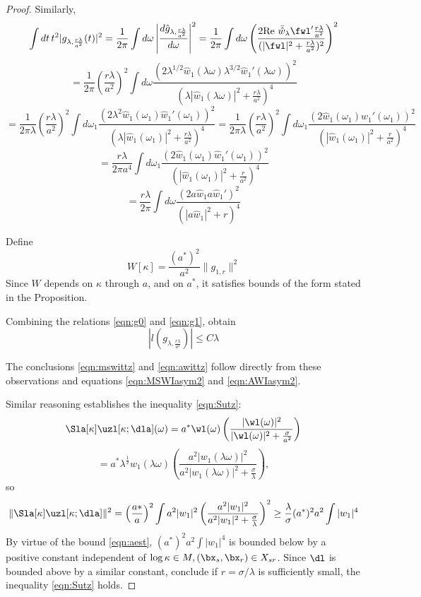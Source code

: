 \begin{proof}
Similarly,
\[
  \int dt\, t^2|g_{\lambda,\frac{r\lambda}{a^2}}(t)|^2 = \frac{1}{2\pi} \int d\omega
  \left|\frac{d\hat{g}_{\lambda,\frac{r\lambda}{a^2}}}{d\omega}\right|^2
  =  \frac{1}{2\pi} \int d\omega  \left(\frac{2 \mbox{Re }\bar{\hat{w}}_{\lambda}\fwl' 
    \frac{r\lambda}{a^2}}{(|\fwl|^2 + \frac{r\lambda}{a^2})^2}\right)^2
\]
\[
  =\frac{1}{2\pi}\left(\frac{r\lambda}{a^2}\right)^2 \int d\omega \frac{(2 \lambda^{1/2}\hat{w}_1(\lambda
    \omega)\lambda^{3/2}\hat{w}_1'(\lambda \omega))^2}{(\lambda|\hat{w}_1(\lambda
    \omega)|^2 + \frac{r\lambda}{a^2})^4}
\]
\[
  =\frac{1}{2\pi\lambda}\left(\frac{r\lambda}{a^2}\right)^2\int d\omega_1 \frac{(2 \lambda^2\hat{w}_1(\omega_1)\hat{w}_1'( \omega_1))^2}{(\lambda|\hat{w}_1(
    \omega_1)|^2 + \frac{r\lambda}{a^2})^4}
  =\frac{1}{2 \pi \lambda}\left(\frac{r\lambda}{a^2}\right)^2\int d\omega_1
  \frac{(2\hat{w}_1(\omega_1)\hat{w}_1'( \omega_1)
    )^2}{\left(|\hat{w}_1(\omega_1)|^2 + \frac{r}{a^2}\right)^4}
\]
\[
  =\frac{r\lambda}{2\pi a^4}\int d\omega_1
  \frac{(2\hat{w}_1(\omega_1)\hat{w}_1'( \omega_1)
    )^2}{\left(|\hat{w}_1(\omega_1)|^2 + \frac{r}{a^2}\right)^4}
\]
\begin{equation}
  \label{eqn:g1}
 = \frac{r\lambda}{2\pi} \int d\omega
  \frac{(2a\hat{w}_1a\hat{w}_1'
    )^2}{\left(|a\hat{w}_1|^2 + r\right)^4}
\end{equation}

Define
\begin{equation}
  \label{eqn:Wdef}
  W[\kappa] = \frac{(a^*)^2}{a^2}\|g_{1,r}\|^2
\end{equation}
Since $W$ depends on $\kappa$ through $a$, and on $a^*$, it satisfies
bounds of the form stated in the Proposition. 

Combining the relations \ref{eqn:g0} and \ref{eqn:g1}, obtain
\begin{equation}
  \label{eqn:pwg}
  |l(g_{\lambda,\frac{r\lambda}{a^2}})| \le C \lambda
\end{equation}

The conclusions \ref{eqn:mswittz} and \ref{eqn:awittz} follow directly
from these observations and equations \ref{eqn:MSWIasym2} and
\ref{eqn:AWIasym2}.

Similar reasoning establishes the inequality \ref{eqn:Sutz}:
\[
  \Sla[\kappa]\uzl[\kappa;\dla](\omega) = a^* \wl(\omega) \left(\frac{|\wl(\omega)|^2}{|\wl(\omega)|^2
      + \frac{\sigma}{a^2}}\right)
\]
\[
  = a^* \lambda^{\frac{1}{2}}w_1(\lambda \omega) \left(\frac{a^2|w_1(\lambda\omega)|^2}{a^2|w_1(\lambda\omega)|^2
      + \frac{\sigma}{\lambda}}\right),
\]
so
\[
  \|\Sla[\kappa]\uzl[\kappa;\dla]\|^2 = \left(\frac{a*}{a}\right)^2
  \int a^2|w_1|^2\left(\frac{a^2|w_1|^2}{a^2|w_1|^2 +
      \frac{\sigma}{\lambda}}\right)^2 \ge \frac{\lambda}{\sigma}
  (a^*)^2a^2 \int |w_1|^4 
\]
By virtue of the bound \ref{eqn:aest}, $(a^*)^2a^2 \int |w_1|^4$ is bounded below
by a positive constant independent of $\log \kappa \in M,
(\bx_s,\bx_r) \in X_{sr}$. Since $\dl$ is bounded above by a similar
constant, conclude if $r = \sigma/\lambda$ is sufficiently small, the
inequality \ref{eqn:Sutz} holds.
\end{proof}

